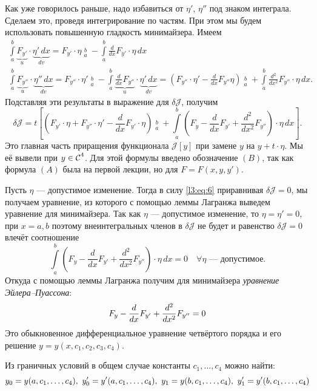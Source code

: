 \documentclass[12pt,a4paper,openany,fleqn]{book}
\newcommand{\Cf}{\ensuremath{\mathcal{C}}}
\newcommand{\J}{\ensuremath{\mathcal{J}}}
\newcommand{\Cfn}[2][]{\ensuremath{\Cf{\mathstrut}^{#2}_{#1}}}
\newcommand{\der}[2]{\ensuremath{\frac{d#1}{d#2}}}
\newcommand{\dder}[2]{\ensuremath{\frac{d^2#1}{d#2^2}}}
\theoremstyle{definition}
\begin{document}
	Как уже говорилось раньше, надо избавиться от $\eta'$, $\eta''$ под знаком интеграла. Сделаем это, проведя интегрирование по частям. При этом мы будем использовать повышенную гладкость минимайзера. Имеем
	\begin{gather*}
		\int\limits_a^b \underbrace{F_{y'}}_{u}\cdot\underbrace{\eta'\,dx}_{dv}=F_{y'}\cdot\eta\mathop{\Big|}\limits_a^b-\int\limits_a^b\der{}{x}F_{y'}\cdot\eta\,dx\\
		\int\limits_a^b \underbrace{F_{y''}}_{u}\cdot\underbrace{\eta''\,dx}_{dv}=F_{y''}\cdot\eta'\mathop{\Big|}\limits_a^b-\int\limits_a^b\underbrace{\der{}{x}F_{y''}}_{u}\cdot\underbrace{\eta'\,dx}_{dv}=\left(F_{y''}\cdot\eta'-\der{}{x}F_{y''}\eta\right)\mathop{\Big|}\limits_a^b+\int\limits_a^b\dder{}{x}F_{y''}\cdot\eta\,dx.
	\end{gather*}
	Подставляя эти результаты в выражение для $\delta\J$, получим 
	\begin{equation}
		\label{l3:eq:B}
		\delta\J=t\left[\left(F_{y'}\cdot\eta+F_{y''}\cdot\eta'-\der{}{x}F_{y'}\cdot\eta\right)\mathop{\Big|}\limits_a^b+\int\limits_a^b\left(F_{y}-\der{}{x}F_{y'}+\dder{}{x}F_{y''}\right)\cdot\eta\,dx\right].\tag{B}
	\end{equation}
	Это главная часть приращения функционала $\J[y]$ при замене $y$ на $y+t\cdot\eta$. Мы её вывели при $y\in\Cfn{4}$. Для этой формулы введено обозначение $(B)$, так как формула $(A)$ была на первой лекции, но для $F=F(x,y,y')$. 
	
	Пусть $\eta$ --- допустимое изменение. Тогда в силу \eqref{l3:eq:6} приравнивая $\delta\J=0$, мы получаем уравнение, из которого с помощью леммы Лагранжа выведем уравнение для минимайзера. Так как $\eta$ --- допустимое изменение, то $\eta=\eta'=0$, при $x=a,b$ поэтому внеинтегральных членов в $\delta\J$ не будет и равенство $\delta\J=0$ влечёт соотношение 
	\begin{equation*}
		\int\limits_a^b\left(F_{y}-\der{}{x}F_{y'}+\dder{}{x}F_{y''}\right)\cdot\eta\,dx=0\quad\forall\eta\text{ --- допустимое.}
	\end{equation*}
	Откуда с помощью леммы Лагранжа получим для минимайзера \emph{уравнение Эйлера--Пуассона}:
	\begin{equation}
		\label{l3:eq:7}
		\hfill F_{y}-\der{}{x}F_{y'}+\dder{}{x}F_{y''}=0\hfill
	\end{equation}
	Это обыкновенное дифференциальное уравнение четвёртого порядка и его решение $y=y(x,c_1,c_2,c_3,c_4)$.
	
	Из граничных условий в общем случае константы $c_1,\ldots,c_4$ можно найти:
	\begin{equation*}
		\hfill y_0=y(a,c_1,\ldots,c_4),\ y'_0=y'(a,c_1,\ldots,c_4),\ y_1=y(b,c_1,\ldots,c_4),\ y'_1=y'(b,c_1,\ldots,c_4)\hfill
	\end{equation*}
\end{document}
